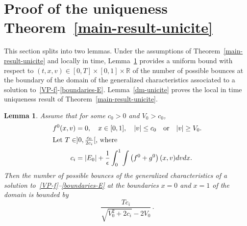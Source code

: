 \documentclass[10pt]{amsart}
\newtheorem{lemm}[theo]{Lemma}\newtheorem{prop}[theo]{Proposition}\newtheorem{coro}[theo]{Corollary}\newtheorem{conj}[theo]{Conjecture}
\theoremstyle{definition}\newtheorem{defi}[theo]{Definition}\newtheorem{rema}[theo]{Remark}\newtheorem{exam}[theo]{Example}\newtheorem{exem}[theo]{Example}\newtheorem{nota}[theo]{Notation}
\newcommand{\R}{\mathbb{R}}
\begin{document}
\section{Proof of the uniqueness Theorem~\ref{main-result-unicite}}\label{pf-main-result-unicite}

This section splits into two lemmas. Under the assumptions of Theorem~\ref{main-result-unicite} and locally in time, Lemma~\ref{cadre-impliquant-nb-fini-de-rebonds} provides a uniform bound with respect to $(t,x,v)\in [0,T] \times [0,1] \times \R $ of the number of possible bounces at the boundary of the domain of the generalized characteristics associated to a solution to~\eqref{VP-f}-\eqref{boundaries-E}. Lemma~\ref{dm-unicite} proves the local in time uniqueness result of Theorem~\ref{main-result-unicite}.

\begin{lemm}\label{cadre-impliquant-nb-fini-de-rebonds}
Assume that for some $c_0>0$ and $V_0>c_0$,
\begin{align}
f^0(x,v) &= 0,\quad x\in [0,1],\quad |v| \leq c_0 \quad \text{or} \quad |v| \geq V_0.\label{troncature2-f0}
\\
\intertext{Let $T\in ] 0,\tfrac{c_0}{2c_i}[$, where}
c_i &= |E_0| + \frac{1}{\epsilon } \int_0^1 \int \left(f^0+g^0\right)(x,v)dvdx.\label{restriction-on-T}
\end{align}
Then the number of possible bounces of the generalized characteristics of a solution to~\eqref{VP-f}--\eqref{boundaries-E} at the boundaries $x=0$ and $x=1$ of the domain is bounded by
\[
\frac{Tc_i}{\sqrt{V_0^2+2c_i}-2V_0} \,.
\]
\end{lemm}
\end{document}
